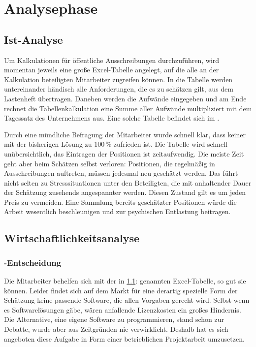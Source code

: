 \section{Analysephase} 
\label{sec:Analysephase} 

\subsection{Ist-Analyse} 
\label{sec:IstAnalyse}
Um Kalkulationen für öffentliche Ausschreibungen durchzuführen, wird momentan
jeweils eine große Excel-Tabelle angelegt, auf die alle an der Kalkulation
beteiligten Mitarbeiter zugreifen können. In die Tabelle werden
untereinander händisch alle Anforderungen, die es zu schätzen gilt, aus dem
Lastenheft übertragen. Daneben werden die Aufwände eingegeben und am Ende
rechnet die Tabellenkalkulation eine Summe aller Aufwände multipliziert mit dem
Tagessatz des Unternehmens aus. Eine solche Tabelle befindet sich im
.

Durch eine mündliche Befragung der Mitarbeiter wurde schnell klar, dass keiner
mit der bisherigen Lösung zu 100\,\% zufrieden ist. Die Tabelle wird schnell
unübersichtlich, das Eintragen der Positionen ist zeitaufwendig. Die meiste
Zeit geht aber beim Schätzen selbst verloren: Positionen, die regelmäßig in
Ausschreibungen auftreten, müssen jedesmal neu geschätzt werden. Das führt
nicht selten zu Stresssituationen unter den Beteiligten, die mit anhaltender
Dauer der Schätzung zusehends angespannter werden. Diesen Zustand gilt es um
jeden Preis zu vermeiden. Eine Sammlung bereits geschätzter Positionen würde die
Arbeit wesentlich beschleunigen und zur psychischen Entlastung beitragen.

\subsection{Wirtschaftlichkeitsanalyse}
\label{sec:Wirtschaftlichkeitsanalyse}

\subsubsection{-Entscheidung}
\label{sec:MakeOrBuyEntscheidung}
Die Mitarbeiter behelfen sich mit der in
\ref{sec:IstAnalyse}:  genannten Excel-Tabelle, so gut
sie können. Leider findet sich auf dem Markt für eine derartig spezielle Form der
Schätzung keine passende Software, die allen Vorgaben gerecht wird. Selbst wenn
es Softwarelösungen gäbe, wären anfallende Lizenzkosten ein großes Hindernis. 
Die Alternative, eine eigene Software zu programmieren, stand schon zur
Debatte, wurde aber aus Zeitgründen nie verwirklicht. Deshalb hat es sich
angeboten diese Aufgabe in Form einer betrieblichen Projektarbeit umzusetzen.

